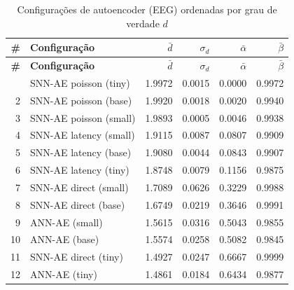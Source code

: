 \begin{longtable}{@{}rlrrrr@{}}
\caption{Configurações de autoencoder (EEG) ordenadas por grau de verdade $d$} \label{tab:phase00ae_eeg} \\
\toprule
\textbf{\#} & \textbf{Configuração} & \textbf{$\bar{d}$} & \textbf{$\sigma_d$} & \textbf{$\bar{\alpha}$} & \textbf{$\bar{\beta}$} \\
\midrule
\endfirsthead
\toprule
\textbf{\#} & \textbf{Configuração} & \textbf{$\bar{d}$} & \textbf{$\sigma_d$} & \textbf{$\bar{\alpha}$} & \textbf{$\bar{\beta}$} \\
\midrule
\endhead
\bottomrule
\endfoot
1 & SNN-AE poisson (tiny) & 1.9972 & 0.0015 & 0.0000 & 0.9972 \\
2 & SNN-AE poisson (base) & 1.9920 & 0.0018 & 0.0020 & 0.9940 \\
3 & SNN-AE poisson (small) & 1.9893 & 0.0005 & 0.0046 & 0.9938 \\
4 & SNN-AE latency (small) & 1.9115 & 0.0087 & 0.0807 & 0.9909 \\
5 & SNN-AE latency (base) & 1.9080 & 0.0044 & 0.0843 & 0.9907 \\
6 & SNN-AE latency (tiny) & 1.8748 & 0.0079 & 0.1156 & 0.9875 \\
7 & SNN-AE direct (small) & 1.7089 & 0.0626 & 0.3229 & 0.9988 \\
8 & SNN-AE direct (base) & 1.6749 & 0.0219 & 0.3646 & 0.9991 \\
9 & ANN-AE (small) & 1.5615 & 0.0316 & 0.5043 & 0.9855 \\
10 & ANN-AE (base) & 1.5574 & 0.0258 & 0.5082 & 0.9845 \\
11 & SNN-AE direct (tiny) & 1.4927 & 0.0247 & 0.6667 & 0.9999 \\
12 & ANN-AE (tiny) & 1.4861 & 0.0184 & 0.6434 & 0.9877 \\
\end{longtable}
